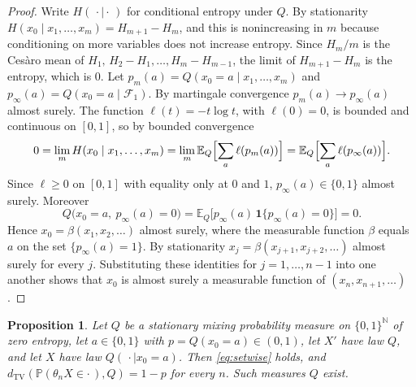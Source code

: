 \documentclass[11pt]{amsart}
\newtheorem{proposition}[theorem]{Proposition}
\theoremstyle{definition}
\theoremstyle{remark}
\newcommand{\N}{\mathbb N}
\newcommand{\E}{\mathbb E}
\newcommand{\Prob}{\mathbb P}
\newcommand{\cF}{\mathcal F}
\newcommand{\dtv}{d_{\mathrm{TV}}}
\newcommand{\one}{\mathbf 1}
\begin{document}
\begin{proof}
Write $H(\,\cdot\mid\cdot\,)$ for conditional entropy under $Q$. By stationarity
$H(x_0\mid x_1,\dots,x_m)=H_{m+1}-H_m$, and this is nonincreasing in $m$ because conditioning on more variables does
not increase entropy. Since $H_m/m$ is the Ces\`aro mean of $H_1,\,H_2-H_1,\dots,H_m-H_{m-1}$, the limit of
$H_{m+1}-H_m$ is the entropy, which is $0$. Let $p_m(a)=Q(x_0=a\mid x_1,\dots,x_m)$ and
$p_\infty(a)=Q(x_0=a\mid\cF_1)$. By martingale convergence $p_m(a)\to p_\infty(a)$ almost surely. The function
$\ell(t)=-t\log t$, with $\ell(0)=0$, is bounded and continuous on $[0,1]$, so by bounded convergence
\[
0=\lim_m H(x_0\mid x_1,\dots,x_m)=\lim_m\E_Q\Bigl[\sum_a\ell(p_m(a))\Bigr]=\E_Q\Bigl[\sum_a\ell(p_\infty(a))\Bigr].
\]
Since $\ell\ge0$ on $[0,1]$ with equality only at $0$ and $1$, $p_\infty(a)\in\{0,1\}$ almost surely. Moreover
\[
Q\bigl(x_0=a,\ p_\infty(a)=0\bigr)=\E_Q\bigl[p_\infty(a)\,\one\{p_\infty(a)=0\}\bigr]=0 .
\]
Hence $x_0=\beta(x_1,x_2,\dots)$ almost surely, where the measurable function $\beta$ equals $a$ on the set
$\{p_\infty(a)=1\}$. By stationarity $x_j=\beta(x_{j+1},x_{j+2},\dots)$ almost surely for every $j$. Substituting
these identities for $j=1,\dots,n-1$ into one another shows that $x_0$ is almost surely a measurable function of
$(x_n,x_{n+1},\dots)$.
\end{proof}

\begin{proposition}\label{prop:binary}
Let $Q$ be a stationary mixing probability measure on $\{0,1\}^\N$ of zero entropy, let $a\in\{0,1\}$ with
$p=Q(x_0=a)\in(0,1)$, let $X'$ have law $Q$, and let $X$ have law $Q(\,\cdot\mid x_0=a)$. Then \eqref{eq:setwise}
holds, and $\dtv(\Prob(\theta_nX\in\cdot\,),Q)=1-p$ for every $n$. Such measures $Q$ exist.
\end{proposition}
\end{document}
